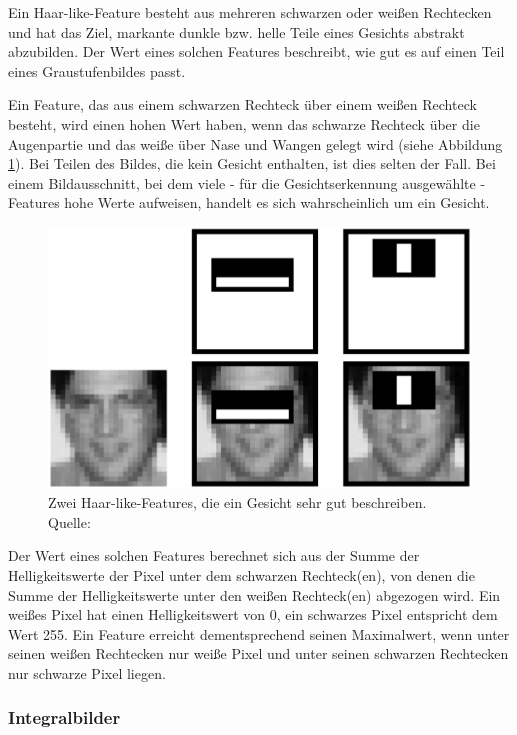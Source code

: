 \documentclass[doktyp=semarbeit, sprache=german]{TUBAFarbeiten}
\begin{document}
Ein Haar-like-Feature besteht aus mehreren schwarzen oder weißen Rechtecken und hat das Ziel, markante dunkle bzw. helle Teile eines Gesichts abstrakt abzubilden. Der Wert eines solchen Features beschreibt, wie gut es auf einen Teil eines Graustufenbildes passt.

Ein Feature, das aus einem schwarzen Rechteck über einem weißen Rechteck besteht, wird einen hohen Wert haben, wenn das schwarze Rechteck über die Augenpartie und das weiße über Nase und Wangen gelegt wird (siehe Abbildung \ref{fig:haarfeatures2}). Bei Teilen des Bildes, die kein Gesicht enthalten, ist dies selten der Fall. Bei einem Bildausschnitt, bei dem viele - für die Gesichtserkennung ausgewählte - Features hohe Werte aufweisen, handelt es sich wahrscheinlich um ein Gesicht.

\begin{figure}
	\centering
	\includegraphics[width=0.7\linewidth]{images/haarfeatures2}
	\caption[Haar-like-Features - Beispiel]{Zwei Haar-like-Features, die ein Gesicht sehr gut beschreiben. Quelle: \cite{Viola01rapidobject}}
	\label{fig:haarfeatures2}
\end{figure}

Der Wert eines solchen Features berechnet sich aus der Summe der Helligkeitswerte der Pixel unter dem schwarzen Rechteck(en), von denen die Summe der Helligkeitswerte unter den weißen Rechteck(en) abgezogen wird. Ein weißes Pixel hat einen Helligkeitswert von 0, ein schwarzes Pixel entspricht dem Wert 255. Ein Feature erreicht dementsprechend seinen Maximalwert, wenn unter seinen weißen Rechtecken nur weiße Pixel und unter seinen schwarzen Rechtecken nur schwarze Pixel liegen.

\subsubsection{Integralbilder}
\end{document}
